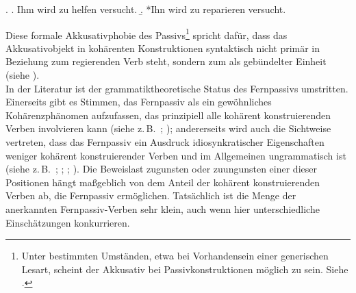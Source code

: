 \ex. 
\a. Ihm wird zu helfen versucht. \label{ex-fernpassiv-dativ}
\b. *Ihn wird zu reparieren versucht. \label{ex-fernpassiv-acc}

Diese formale Akkusativphobie des Passivs\footnote{Unter bestimmten Umständen, etwa bei Vorhandensein einer generischen Lesart, scheint der Akkusativ bei Passivkonstruktionen möglich zu sein. Siehe \citet[301ff]{Meurers:99}.} spricht dafür, dass das Akkusativobjekt in kohärenten Konstruktionen syntaktisch nicht primär in Beziehung zum regierenden Verb steht, sondern zum  als gebündelter Einheit (siehe \citealt[253]{Haider:93}). \\

In der Literatur ist der grammatiktheoretische Status des Fernpassivs umstritten. Einerseits gibt es Stimmen, das Fernpassiv als ein gewöhnliches Kohärenzphänomen aufzufassen, das prinzipiell alle kohärent konstruierenden Verben involvieren kann (siehe z.\,B.\ \citealt{Wurmbrand:01}; \citealt{Sabel:01}); andererseits wird auch die Sichtweise vertreten, dass das Fernpassiv ein Ausdruck idiosynkratischer Eigenschaften weniger kohärent konstruierender Verben und im Allgemeinen ungrammatisch ist (siehe z.\,B.\ \citealt[177f]{Hoehle:78}; \citealt[Abschnitt~3.3.1.4]{Kiss:95}; \citealt{Reis:Sternefeld:04}; \citealt{Grosse:05}). Die Beweislast zugunsten oder zuungunsten einer dieser Positionen hängt ma\ss geblich von dem Anteil der kohärent konstruierenden Verben ab, die Fernpassiv ermöglichen. Tatsächlich ist die Menge der anerkannten Fernpassiv-Verben sehr klein, auch wenn hier unterschiedliche Einschätzungen konkurrieren. 

